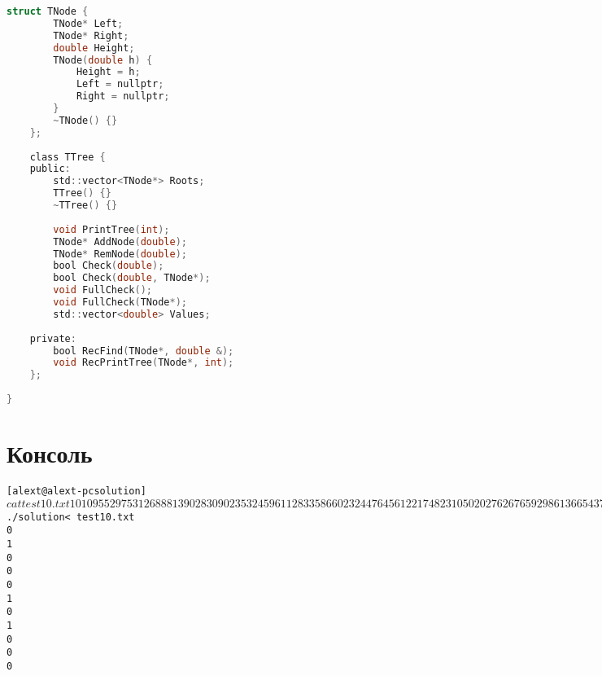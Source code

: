 \begin{lstlisting}[language=C]
	struct TNode {
		TNode* Left;
		TNode* Right;
		double Height;
		TNode(double h) {
			Height = h;
			Left = nullptr;
			Right = nullptr;
		}
		~TNode() {}
	};
	
	class TTree {
	public:
		std::vector<TNode*> Roots;
		TTree() {}
		~TTree() {}
	
		void PrintTree(int);
		TNode* AddNode(double);
		TNode* RemNode(double);
		bool Check(double);
		bool Check(double, TNode*);
		void FullCheck();
		void FullCheck(TNode*);
		std::vector<double> Values;
	
	private:
		bool RecFind(TNode*, double &);
		void RecPrintTree(TNode*, int);
	};
	
}
\end{lstlisting}

\pagebreak

\section{Консоль}
\begin{alltt}
	[alext@alext-pc solution]$ cat test10.txt 
	10 10
	9552 9753 1268
	8813 9028 3090
	2353 2459 6112
	8335 8660 2324
	4764 5612 2174
	823 1050 2027
	6267 6592 9861
	3665 4378 6732
	6551 7493 8248
	1892 2490 3770
	6636 7150
	5971 4256
	2315 8539
	7347 4668
	5997 3459
	9356 5322
	5783 4120
	8171 4309
	4944 1750
	2688 7563
	[alext@alext-pc solution]$ ./solution <\ test10.txt 
	0
	1
	0
	0
	0
	1
	0
	1
	0
	0
	0
\end{alltt}
\pagebreak